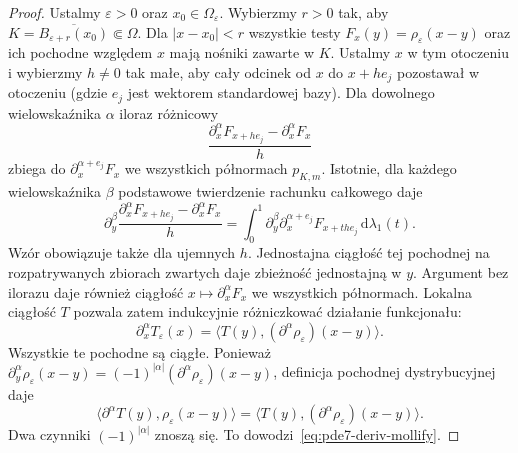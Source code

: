 \begin{proof}
Ustalmy $\varepsilon>0$ oraz $x_0\in\Omega_\varepsilon$.
Wybierzmy $r>0$ tak, aby
$K=\overline{B_{\varepsilon+r}(x_0)}\Subset\Omega$.
Dla $|x-x_0|<r$ wszystkie testy
$F_x(y)=\rho_\varepsilon(x-y)$ oraz ich pochodne
względem $x$ mają nośniki zawarte w $K$.
Ustalmy $x$ w tym otoczeniu i wybierzmy $h\ne0$
tak małe, aby cały odcinek od $x$ do $x+he_j$
pozostawał w otoczeniu (gdzie $e_j$ jest wektorem
standardowej bazy). Dla dowolnego wielowskaźnika
$\alpha$ iloraz różnicowy
\[
 \frac{\partial_x^\alpha F_{x+he_j}
             -\partial_x^\alpha F_x}{h}
\]
zbiega do $\partial_x^{\alpha+e_j}F_x$
we wszystkich półnormach $p_{K,m}$.
Istotnie, dla każdego wielowskaźnika $\beta$
podstawowe twierdzenie rachunku całkowego daje
\[
 \partial_y^\beta
 \frac{\partial_x^\alpha F_{x+he_j}
       -\partial_x^\alpha F_x}{h}
 =\int_0^1\partial_y^\beta
 \partial_x^{\alpha+e_j}F_{x+the_j}\,
 \mathrm d\lambda_1(t).
\]
Wzór obowiązuje także dla ujemnych $h$.
Jednostajna ciągłość tej pochodnej na rozpatrywanych
zbiorach zwartych daje zbieżność jednostajną w $y$.
Argument bez ilorazu daje również ciągłość
$x\mapsto\partial_x^\alpha F_x$ we wszystkich
półnormach. Lokalna ciągłość $T$ pozwala zatem
indukcyjnie różniczkować działanie funkcjonału:
\[
 \partial_x^\alpha T_\varepsilon(x)
 =\langle T(y),(\partial^\alpha\rho_\varepsilon)(x-y)\rangle.
\]
Wszystkie te pochodne są ciągłe.
Ponieważ
$\partial_y^\alpha\rho_\varepsilon(x-y)
=(-1)^{|\alpha|}(\partial^\alpha\rho_\varepsilon)(x-y)$,
definicja pochodnej dystrybucyjnej daje
\[
 \langle\partial^\alpha T(y),\rho_\varepsilon(x-y)\rangle
 =\langle T(y),(\partial^\alpha\rho_\varepsilon)(x-y)\rangle.
\]
Dwa czynniki $(-1)^{|\alpha|}$ znoszą się.
To dowodzi~\eqref{eq:pde7-deriv-mollify}.


\end{proof}
